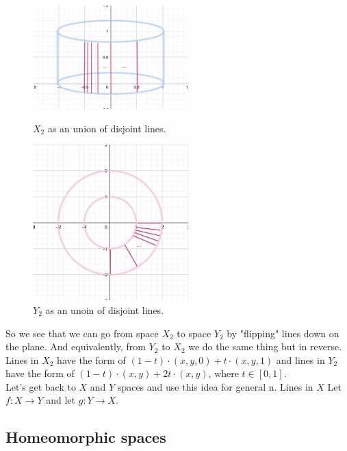 \documentclass[a4paper,11pt]{article}
\begin{document}
\begin{figure}[ht!]
    \begin{minipage}{0.45\textwidth}
        \centering
        \includegraphics[width=60mm]{X_n2_lines.png}
        \caption{$X_2$ as an union of disjoint lines.}
      \end{minipage}\hfill
    \begin{minipage}{0.55\textwidth}
        \centering
        \includegraphics[width=60mm]{Y_n2_lines.png}
        \caption{$Y_2$ as an unoin of disjoint lines.}
      \end{minipage}\hfill
   \end{figure}

\noindent
So we see that we can go from space $X_2$ to space $Y_2$ by "flipping" lines down on the plane. And equivalently, from $Y_2$ to $X_2$ we do the same thing but in reverse.
\\
Lines in $X_2$ have the form of $(1 - t) \cdot (x, y, 0) + t \cdot (x, y, 1)$ and lines in $Y_2$ have the form of $(1 - t) \cdot (x, y) + 2  t \cdot (x, y)$, where $ t \in [0, 1]$.
\\

Let's get back to $X$ and $Y$ spaces and use this idea for general n.
Lines in $X$
Let $f: X \to Y$ and let $g: Y \to X$. 



\subsection{Homeomorphic spaces}
\end{document}
